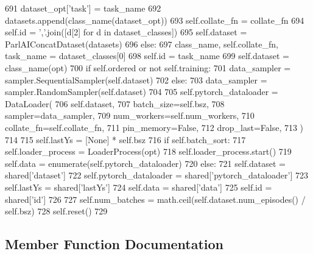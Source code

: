 \begin{DoxyCode}
691                     dataset\_opt[\textcolor{stringliteral}{'task'}] = task\_name
692                     datasets.append(class\_name(dataset\_opt))
693                     self.collate\_fn = collate\_fn
694                 self.id = \textcolor{stringliteral}{','}.join([d[2] \textcolor{keywordflow}{for} d \textcolor{keywordflow}{in} dataset\_classes])
695                 self.dataset = ParlAIConcatDataset(datasets)
696             \textcolor{keywordflow}{else}:
697                 class\_name, self.collate\_fn, task\_name = dataset\_classes[0]
698                 self.id = task\_name
699                 self.dataset = class\_name(opt)
700             \textcolor{keywordflow}{if} self.ordered \textcolor{keywordflow}{or} \textcolor{keywordflow}{not} self.training:
701                 data\_sampler = sampler.SequentialSampler(self.dataset)
702             \textcolor{keywordflow}{else}:
703                 data\_sampler = sampler.RandomSampler(self.dataset)
704 
705             self.pytorch\_dataloader = DataLoader(
706                 self.dataset,
707                 batch\_size=self.bsz,
708                 sampler=data\_sampler,
709                 num\_workers=self.num\_workers,
710                 collate\_fn=self.collate\_fn,
711                 pin\_memory=\textcolor{keyword}{False},
712                 drop\_last=\textcolor{keyword}{False},
713             )
714 
715             self.lastYs = [\textcolor{keywordtype}{None}] * self.bsz
716             \textcolor{keywordflow}{if} self.batch\_sort:
717                 self.loader\_process = LoaderProcess(opt)
718                 self.loader\_process.start()
719             self.data = enumerate(self.pytorch\_dataloader)
720         \textcolor{keywordflow}{else}:
721             self.dataset = shared[\textcolor{stringliteral}{'dataset'}]
722             self.pytorch\_dataloader = shared[\textcolor{stringliteral}{'pytorch\_dataloader'}]
723             self.lastYs = shared[\textcolor{stringliteral}{'lastYs'}]
724             self.data = shared[\textcolor{stringliteral}{'data'}]
725             self.id = shared[\textcolor{stringliteral}{'id'}]
726 
727         self.num\_batches = math.ceil(self.dataset.num\_episodes() / self.bsz)
728         self.reset()
729 
\end{DoxyCode}


\subsection{Member Function Documentation}
\mbox{\label{classparlai_1_1core_1_1pytorch__data__teacher_1_1PytorchDataTeacher_abf7e494a90ed5c7d037c2b1cfb41c84c}} 
